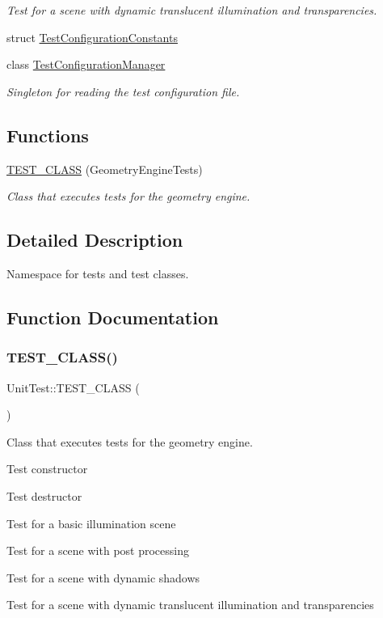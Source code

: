 \begin{DoxyCompactItemize}
\begin{DoxyCompactList}\small\item\em Test for a scene with dynamic translucent illumination and transparencies. \end{DoxyCompactList}\item 
struct \mbox{\hyperlink{struct_unit_test_1_1_test_configuration_constants}{Test\+Configuration\+Constants}}
\item 
class \mbox{\hyperlink{class_unit_test_1_1_test_configuration_manager}{Test\+Configuration\+Manager}}
\begin{DoxyCompactList}\small\item\em Singleton for reading the test configuration file. \end{DoxyCompactList}\end{DoxyCompactItemize}
\subsection*{Functions}
\begin{DoxyCompactItemize}
\item 
\mbox{\hyperlink{namespace_unit_test_aa27c1a34f019a757474599d420492bf6}{T\+E\+S\+T\+\_\+\+C\+L\+A\+SS}} (Geometry\+Engine\+Tests)
\begin{DoxyCompactList}\small\item\em Class that executes tests for the geometry engine. \end{DoxyCompactList}\end{DoxyCompactItemize}


\subsection{Detailed Description}
Namespace for tests and test classes. 

\subsection{Function Documentation}
\mbox{\label{namespace_unit_test_aa27c1a34f019a757474599d420492bf6}} 
\subsubsection{\texorpdfstring{TEST\_CLASS()}{TEST\_CLASS()}}
{\footnotesize\ttfamily Unit\+Test\+::\+T\+E\+S\+T\+\_\+\+C\+L\+A\+SS (\begin{DoxyParamCaption}\item[{Geometry\+Engine\+Tests}]{ }\end{DoxyParamCaption})}



Class that executes tests for the geometry engine. 

Test constructor

Test destructor

Test for a basic illumination scene

Test for a scene with post processing

Test for a scene with dynamic shadows

Test for a scene with dynamic translucent illumination and transparencies 